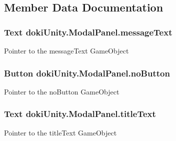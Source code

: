 \subsection{Member Data Documentation}
\subsubsection[{\texorpdfstring{message\+Text}{messageText}}]{\setlength{\rightskip}{0pt plus 5cm}Text doki\+Unity.\+Modal\+Panel.\+message\+Text}\hypertarget{classdoki_unity_1_1_modal_panel_a6c9c26430055c5e6beb1d7db2dfb6f68}{}\label{classdoki_unity_1_1_modal_panel_a6c9c26430055c5e6beb1d7db2dfb6f68}


Pointer to the message\+Text Game\+Object 

\subsubsection[{\texorpdfstring{no\+Button}{noButton}}]{\setlength{\rightskip}{0pt plus 5cm}Button doki\+Unity.\+Modal\+Panel.\+no\+Button}\hypertarget{classdoki_unity_1_1_modal_panel_ab383aea9285e694802836034b933f1f5}{}\label{classdoki_unity_1_1_modal_panel_ab383aea9285e694802836034b933f1f5}


Pointer to the no\+Button Game\+Object 

\subsubsection[{\texorpdfstring{title\+Text}{titleText}}]{\setlength{\rightskip}{0pt plus 5cm}Text doki\+Unity.\+Modal\+Panel.\+title\+Text}\hypertarget{classdoki_unity_1_1_modal_panel_a8bb32dc36292b9da60c7125f150d759d}{}\label{classdoki_unity_1_1_modal_panel_a8bb32dc36292b9da60c7125f150d759d}


Pointer to the title\+Text Game\+Object 

